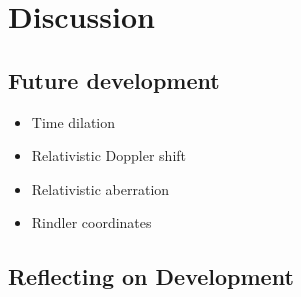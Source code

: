 \documentclass[a4paper]{article}
\begin{document}
\section{Discussion}

\subsection{Future development}
\begin{itemize}
    \item Time dilation
    \item Relativistic Doppler shift
    \item Relativistic aberration
    \item Rindler coordinates
\end{itemize}

\subsection{Reflecting on Development}


\vspace{2em}
\noindent



\end{document}
